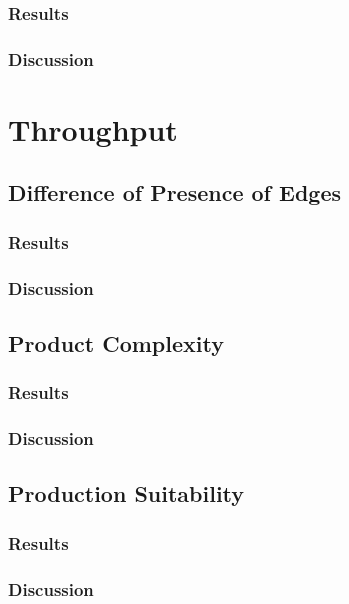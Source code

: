 \subsubsection{Results}

\subsubsection{Discussion}

\section{Throughput}

\subsection{Difference of Presence of Edges}

\subsubsection{Results}

\subsubsection{Discussion}

\subsection{Product Complexity }

\subsubsection{Results}

\subsubsection{Discussion}

\subsection{Production Suitability }

\subsubsection{Results}

\subsubsection{Discussion}

